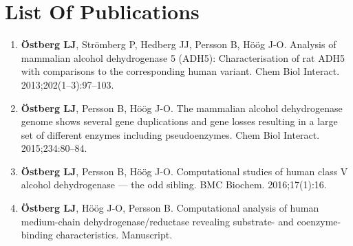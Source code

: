 \documentclass[a4paper, twoside, 12pt, openright]{report}
\begin{document}
\thispagestyle{empty}


\chapter*{List Of Publications}

\thispagestyle{empty}

\begin{enumerate}[label=\Roman*]
 \item {\bf Östberg LJ}, Strömberg P, Hedberg JJ, Persson B, Höög J-O. Analysis of mammalian alcohol dehydrogenase 5 (ADH5): Characterisation of rat ADH5 with comparisons to the corresponding human variant. Chem Biol Interact. 2013;202(1--3):97--103.
 \label{paper:adh5_2013}
 \item {\bf Östberg LJ}, Persson B, Höög J-O. The mammalian alcohol dehydrogenase genome shows several gene duplications and gene losses resulting in a large set of different enzymes including pseudoenzymes. Chem Biol Interact. 2015;234:80--84.
 \label{paper:mammalian_adhs}
 \item {\bf Östberg LJ}, Persson B, Höög J-O. Computational studies of human class V alcohol dehydrogenase --- the odd sibling. BMC Biochem. 2016;17(1):16.
 \label{paper:adh5_2016}
 \item {\bf Östberg LJ}, Höög J-O, Persson B. Computational analysis of human medium-chain dehydrogenase/reductase revealing substrate- and coenzyme-binding characteristics. Manuscript.
 \label{paper:mdrs}
\end{enumerate}
\end{document}
